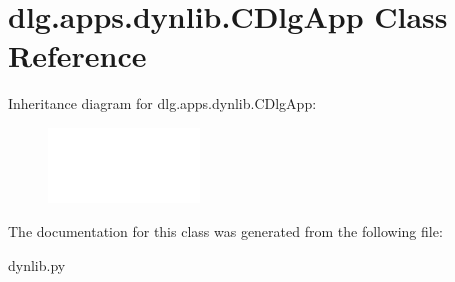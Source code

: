 \hypertarget{classdlg_1_1apps_1_1dynlib_1_1_c_dlg_app}{}\section{dlg.\+apps.\+dynlib.\+C\+Dlg\+App Class Reference}
\label{classdlg_1_1apps_1_1dynlib_1_1_c_dlg_app}
Inheritance diagram for dlg.\+apps.\+dynlib.\+C\+Dlg\+App\+:\begin{figure}[H]
\begin{center}
\leavevmode
\includegraphics[height=2.000000cm]{classdlg_1_1apps_1_1dynlib_1_1_c_dlg_app}
\end{center}
\end{figure}


The documentation for this class was generated from the following file\+:\begin{DoxyCompactItemize}
\item 
dynlib.\+py\end{DoxyCompactItemize}
